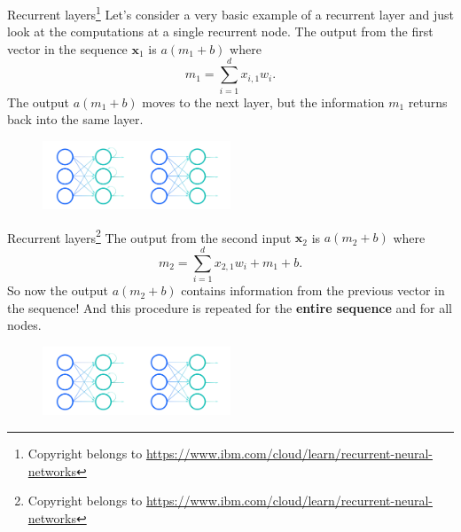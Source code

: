 \documentclass{beamer}
\begin{document}
\begin{frame}{Recurrent layers\footnote{Copyright belongs to \url{https://www.ibm.com/cloud/learn/recurrent-neural-networks}}}
Let's consider a very basic example of a recurrent layer and just look at the computations at a single recurrent node. The output from the first vector in the sequence $\mathbf{x}_1$ is $a(m_1+b)$ where
\[
m_1=\sum^d_{i=1}x_{i,1}w_i.
\]
The output $a(m_1+b)$ moves to the next layer, but the information $m_1$ returns back into the same layer.
\begin{figure}
\centering
\includegraphics[width=0.5\textwidth]{Images/rnn.png}
\end{figure}
\end{frame}
\begin{frame}{Recurrent layers\footnote{Copyright belongs to \url{https://www.ibm.com/cloud/learn/recurrent-neural-networks}}} The output from the second input $\mathbf{x}_2$ is $a(m_2+b)$ where
\[
m_2=\sum^d_{i=1}x_{2,1}w_i+m_1+b.
\]
So now the output $a(m_2+b)$ contains information from the previous vector in the sequence! And this procedure is repeated for the \textbf{entire sequence} and for all nodes.
\begin{figure}
\centering
\includegraphics[width=0.5\textwidth]{Images/rnn.png}
\end{figure}
\end{frame}
\end{document}
